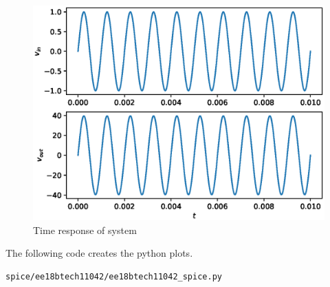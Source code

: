\begin{enumerate}[label=\thesubsection.\arabic*.,ref=\thesubsection.\theenumi]
\begin{figure}[!ht]
    \includegraphics[width = \columnwidth]{./spice/ee18btech11042/spice.eps}
    \caption{Time response of system}
    \label{fig:ee18btech11042_3}
\end{figure}
The following code creates the python plots.
\begin{lstlisting}
spice/ee18btech11042/ee18btech11042_spice.py
\end{lstlisting}







\end{enumerate}



